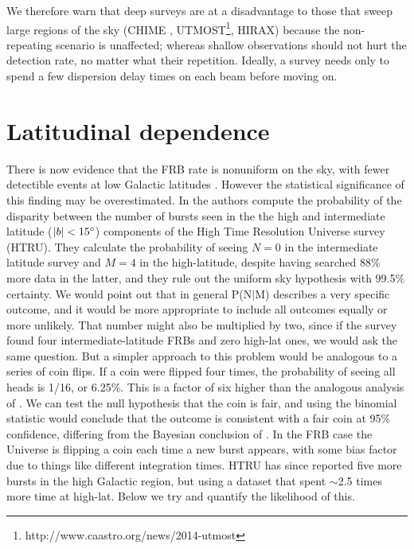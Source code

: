 \documentclass[useAMS,usenatbib]{mn2e}
\begin{document}
We therefore warn that deep surveys are at a disadvantage 
to those that sweep large regions of the sky 
(CHIME  \citep{2014SPIE.9145E..22B}, 
UTMOST\footnote{http://www.caastro.org/news/2014-utmost}, HIRAX)
because the non-repeating 
scenario is unaffected; whereas shallow observations 
should not hurt the detection rate, no matter what their repetition. 
Ideally, a survey
needs only to spend a few dispersion delay times on each beam 
before moving on. 

\section{Latitudinal dependence}
\label{latitude}
There is now evidence that the FRB rate is nonuniform on the sky, 
with fewer detectible events at low Galactic latitudes \citep{2014ira..book.....B}.
However the statistical significance of this finding may be 
overestimated. In \citep{2014ApJ...789L..26P}
the authors compute the probability of the disparity between the number of 
bursts seen in the the high and intermediate latitude ($|b| < 15\degree$)
components of the High Time Resolution Universe survey 
(HTRU). They calculate the probability of seeing $N=0$ in the intermediate 
latitude survey and $M=4$ in 
the high-latitude, despite having searched 88$\%$ more data in the latter, and they 
rule out the uniform sky hypothesis with 99.5$\%$ certainty. We would point out 
that in general P(N$|$M) describes a very specific outcome, and it would be 
more appropriate to include all outcomes equally or more unlikely.
That number might also be multiplied by two, since if the survey found 
four intermediate-latitude FRBs and zero high-lat ones, we would ask the same 
question. 
But a simpler approach to this problem would be analogous to a series of 
coin flips. If a coin were flipped four times, the probability of seeing all heads is 1/16, 
or 6.25$\%$. This is a factor of six higher than  the analogous analysis of 
\citet{2014ApJ...789L..26P}.  We can test the null hypothesis that the coin is fair, and using
the binomial statistic would conclude that the outcome is consistent with a 
fair coin at 95\% confidence, differing from the Bayesian conclusion of \citet{2014ApJ...789L..26P}.
In the FRB case the Universe is flipping a coin each time a new burst 
appears, with some bias factor due to things like different integration times.
HTRU 
has since reported five more bursts in the high Galactic region, but using a dataset 
that spent $\sim$2.5 times more time at high-lat. Below we try and quantify the likelihood of 
this.
\end{document}
